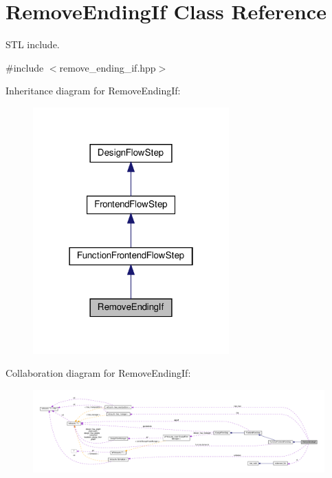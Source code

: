 \hypertarget{classRemoveEndingIf}{}\section{Remove\+Ending\+If Class Reference}
\label{classRemoveEndingIf}


S\+TL include.  




{\ttfamily \#include $<$remove\+\_\+ending\+\_\+if.\+hpp$>$}



Inheritance diagram for Remove\+Ending\+If\+:
\nopagebreak
\begin{figure}[H]
\begin{center}
\leavevmode
\includegraphics[width=214pt]{de/d1f/classRemoveEndingIf__inherit__graph}
\end{center}
\end{figure}


Collaboration diagram for Remove\+Ending\+If\+:
\nopagebreak
\begin{figure}[H]
\begin{center}
\leavevmode
\includegraphics[width=350pt]{df/d7b/classRemoveEndingIf__coll__graph}
\end{center}
\end{figure}
